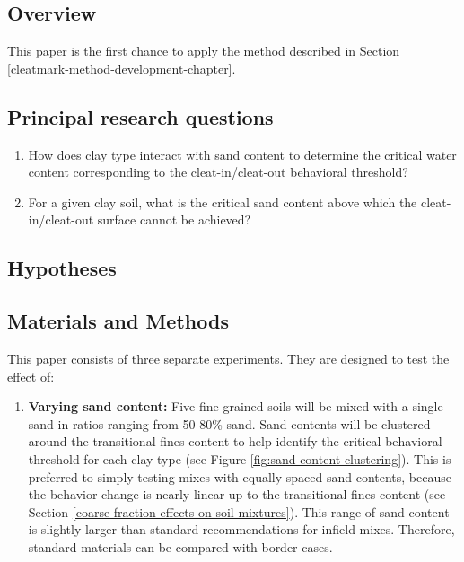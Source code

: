 \documentclass[
  letterpaper,
  openany]{book}
\providecommand{\tightlist}{%
  \setlength{\itemsep}{0pt}\setlength{\parskip}{0pt}}
\begin{document}
\hypertarget{overview-1}{%
\subsection{Overview}\label{overview-1}}

This paper is the first chance to apply the method described in Section \ref{cleatmark-method-development-chapter}.

\hypertarget{principal-research-questions-1}{%
\subsection{Principal research questions}\label{principal-research-questions-1}}

\begin{enumerate}
\def\labelenumi{\arabic{enumi}.}
\item
  How does clay type interact with sand content to determine the critical water content corresponding to the cleat-in/cleat-out behavioral threshold?
\item
  For a given clay soil, what is the critical sand content above which the cleat-in/cleat-out surface cannot be achieved?
\end{enumerate}

\hypertarget{hypotheses-1}{%
\subsection{Hypotheses}\label{hypotheses-1}}

\hypertarget{materials-and-methods-1}{%
\subsection{Materials and Methods}\label{materials-and-methods-1}}

This paper consists of three separate experiments. They are designed to test the effect of:

\begin{enumerate}
\def\labelenumi{\arabic{enumi}.}
\tightlist
\item
  \textbf{Varying sand content:} Five fine-grained soils will be mixed with a single sand in ratios ranging from 50-80\% sand.
  Sand contents will be clustered around the transitional fines content to help identify the critical behavioral threshold for each clay type (see Figure \ref{fig:sand-content-clustering}).
  This is preferred to simply testing mixes with equally-spaced sand contents, because the behavior change is nearly linear up to the transitional fines content (see Section \ref{coarse-fraction-effects-on-soil-mixtures}).
  This range of sand content is slightly larger than standard recommendations for infield mixes.
  Therefore, standard materials can be compared with border cases.
\end{enumerate}
\end{document}
